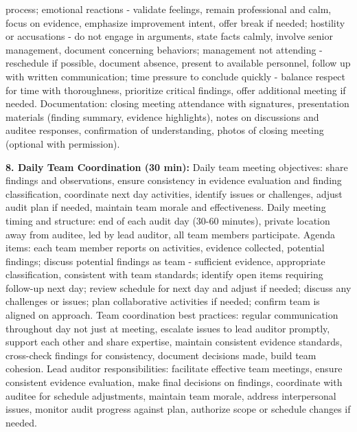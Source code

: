 \documentclass[11pt,a4paper]{article}
\begin{document}
process; emotional reactions - validate feelings, remain professional and calm, focus on evidence, emphasize improvement intent, offer break if needed; hostility or accusations - do not engage in arguments, state facts calmly, involve senior management, document concerning behaviors; management not attending - reschedule if possible, document absence, present to available personnel, follow up with written communication; time pressure to conclude quickly - balance respect for time with thoroughness, prioritize critical findings, offer additional meeting if needed. Documentation: closing meeting attendance with signatures, presentation materials (finding summary, evidence highlights), notes on discussions and auditee responses, confirmation of understanding, photos of closing meeting (optional with permission).

\textbf{8. Daily Team Coordination (30 min):} Daily team meeting objectives: share findings and observations, ensure consistency in evidence evaluation and finding classification, coordinate next day activities, identify issues or challenges, adjust audit plan if needed, maintain team morale and effectiveness. Daily meeting timing and structure: end of each audit day (30-60 minutes), private location away from auditee, led by lead auditor, all team members participate. Agenda items: each team member reports on activities, evidence collected, potential findings; discuss potential findings as team - sufficient evidence, appropriate classification, consistent with team standards; identify open items requiring follow-up next day; review schedule for next day and adjust if needed; discuss any challenges or issues; plan collaborative activities if needed; confirm team is aligned on approach. Team coordination best practices: regular communication throughout day not just at meeting, escalate issues to lead auditor promptly, support each other and share expertise, maintain consistent evidence standards, cross-check findings for consistency, document decisions made, build team cohesion. Lead auditor responsibilities: facilitate effective team meetings, ensure consistent evidence evaluation, make final decisions on findings, coordinate with auditee for schedule adjustments, maintain team morale, address interpersonal issues, monitor audit progress against plan, authorize scope or schedule changes if needed.
\end{document}
